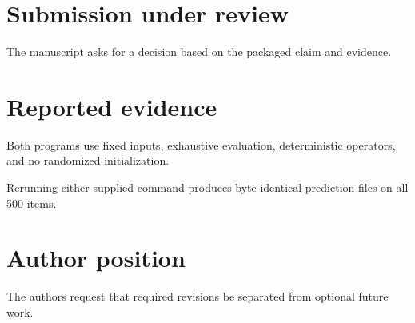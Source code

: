 \documentclass{article}
\begin{document}
\section{Submission under review}
The manuscript asks for a decision based on the packaged claim and evidence.
\section{Reported evidence}
Both programs use fixed inputs, exhaustive evaluation, deterministic operators, and no randomized initialization.

Rerunning either supplied command produces byte-identical prediction files on all 500 items.
\section{Author position}
The authors request that required revisions be separated from optional future work.
\end{document}

